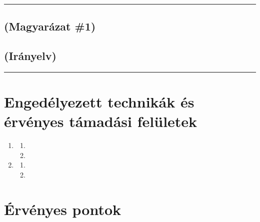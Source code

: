 \documentclass[]{report}
\newenvironment{expl}[0]%
  {\rule{\textwidth}{.2pt}\footnotesize}%
  {\rule{\textwidth}{.2pt}\normalsize}
\begin{document}
\begin{expl}
\section*{(Magyarázat \#1)}


\section*{(Irányelv)}

\end{expl}


\chapter{Engedélyezett technikák és érvényes támadási felületek}

\begin{enumerate}
\item

  \begin{enumerate}
    \item
    
    \item
    
  \end{enumerate}

\item

    \begin{enumerate}
    \item
    
    \item
    
    \end{enumerate}
\end{enumerate}


\chapter{Érvényes pontok}
\end{document}
